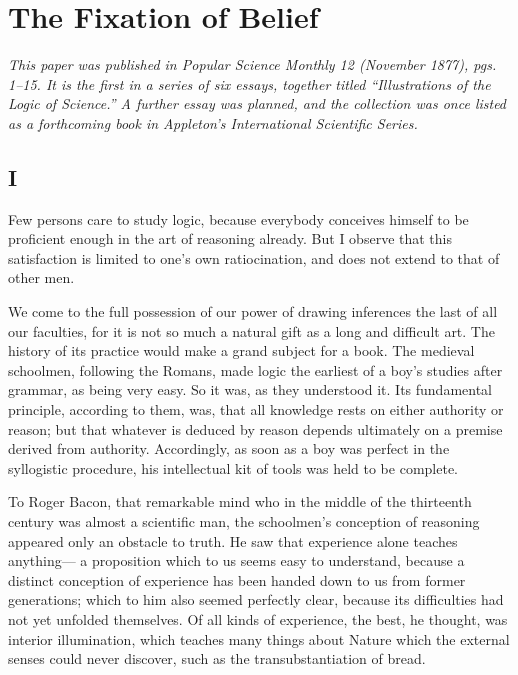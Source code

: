 
\section*{The Fixation of Belief}
\emph{This paper was published in \emph{Popular Science Monthly} 12 (November 1877), pgs. 1--15. It is the first in a series of six essays, together titled ``Illustrations of the Logic of Science.'' A further essay was planned, and the collection was once listed as a forthcoming book in Appleton's International Scientific Series.}

\subsection*{I}


Few persons care to study logic, because everybody conceives himself to be proficient enough in the art of reasoning already. But I observe that this satisfaction is limited to one's own ratiocination, and does not extend to that of other men.

We come to the full possession of our power of drawing inferences the last of all our faculties, for it is not so much a natural gift as a long and difficult art. The history of its practice would make a grand subject for a book. The medieval schoolmen, following the Romans, made logic the earliest of a boy's studies after grammar, as being very easy. So it was, as they understood it. Its fundamental principle, according to them, was, that all knowledge rests on either authority or reason; but that whatever is deduced by reason depends ultimately on a premise derived from authority. Accordingly, as soon as a boy was perfect in the syllogistic procedure, his intellectual kit of tools was held to be complete.

To Roger Bacon, that remarkable mind who in the middle of the thirteenth century was almost a scientific man, the schoolmen's conception of reasoning appeared only an obstacle to truth. He saw that experience alone teaches any\-thing--- a proposition which to us seems easy to understand, because a distinct conception of experience has been handed down to us from former generations; which to him also seemed perfectly clear, because its difficulties had not yet unfolded themselves. Of all kinds of experience, the best, he thought, was interior illumination, which teaches many things about Nature which the external senses could never discover, such as the transubstantiation of bread.

